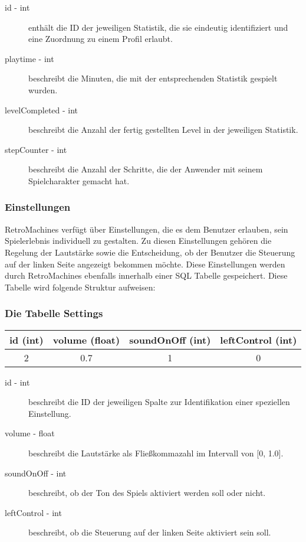 \begin{description}
	\item[id - int] enthält die ID der jeweiligen Statistik, die sie eindeutig identifiziert und eine Zuordnung zu einem Profil erlaubt.
	\item[playtime - int] beschreibt die Minuten, die mit der entsprechenden Statistik gespielt wurden.
	\item[levelCompleted - int] beschreibt die Anzahl der fertig gestellten Level in der jeweiligen Statistik.
	\item[stepCounter - int] beschreibt die Anzahl der Schritte, die der Anwender mit seinem Spielcharakter gemacht hat.
\end{description}

\subsubsection{Einstellungen}

RetroMachines verfügt über Einstellungen, die es dem Benutzer erlauben, sein Spielerlebnis individuell zu gestalten. Zu diesen Einstellungen gehören die Regelung der Lautstärke sowie die Entscheidung, ob der Benutzer die Steuerung auf der linken Seite angezeigt bekommen möchte. Diese Einstellungen werden durch RetroMachines ebenfalls innerhalb einer SQL Tabelle gespeichert. Diese Tabelle wird folgende Struktur aufweisen:

{\center
\subsubsection*{Die Tabelle Settings}
\begin{tabular}{cccc}
	\hline
	id (int) & volume (float) & soundOnOff (int) & leftControl (int) \\
	\hline
	2 & 0.7 & 1 & 0 \\
	\hline
\end{tabular}
\par
}

\begin{description}
	\item[id - int] beschreibt die ID der jeweiligen Spalte zur Identifikation einer speziellen Einstellung.
	\item[volume - float] beschreibt die Lautstärke als Fließkommazahl im Intervall von [0, 1.0].
	\item[soundOnOff - int] beschreibt, ob der Ton des Spiels aktiviert werden soll oder nicht.
	\item[leftControl - int] beschreibt, ob die Steuerung auf der linken Seite aktiviert sein soll.
\end{description}

